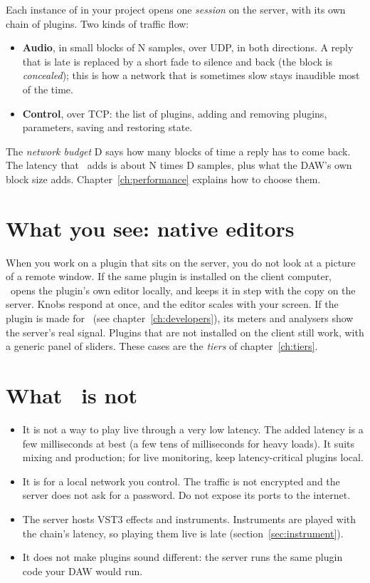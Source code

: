 Each instance of  in your project opens one \emph{session} on
the server, with its own chain of plugins. Two kinds of traffic flow:

\begin{itemize}
  \item \textbf{Audio}, in small blocks of N samples, over UDP, in both
    directions. A reply that is late is replaced by a short fade to silence
    and back (the block is \emph{concealed}); this is how a network that is
    sometimes slow stays inaudible most of the time.
  \item \textbf{Control}, over TCP: the list of plugins, adding and
    removing plugins, parameters, saving and restoring state.
\end{itemize}

The \emph{network budget} D says how many blocks of time a reply has to come
back. The latency that \fxme\ adds is about N times D samples, plus what the
DAW's own block size adds. Chapter~\ref{ch:performance} explains how to
choose them.

\section{What you see: native editors}

When you work on a plugin that sits on the server, you do not look at a
picture of a remote window. If the same plugin is installed on the client
computer, \fxme\ opens the plugin's own editor locally, and keeps it in
step with the copy on the server. Knobs respond at once, and the editor
scales with your screen. If the plugin is made for \fxme\ (see
chapter~\ref{ch:developers}), its meters and analysers show the server's
real signal. Plugins that are not installed on the client still work, with a
generic panel of sliders. These cases are the \emph{tiers} of
chapter~\ref{ch:tiers}.

\section{What \fxme\ is not}

\begin{itemize}
  \item It is not a way to play live through a very low latency. The added
    latency is a few milliseconds at best (a few tens of milliseconds for
    heavy loads). It suits mixing and production; for live monitoring,
    keep latency-critical plugins local.
  \item It is for a local network you control. The traffic is not
    encrypted and the server does not ask for a password.
    Do not expose its ports to the internet.
  \item The server hosts VST3 effects and instruments. Instruments are
    played with the chain's latency, so playing them live is late
    (section~\ref{sec:instrument}).
  \item It does not make plugins sound different: the server runs the same
    plugin code your DAW would run.
\end{itemize}

